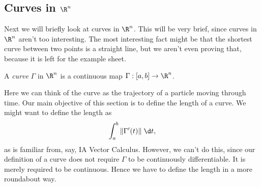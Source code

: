 \documentclass[a4paper]{article}
\begin{document}
\subsection{Curves in \texorpdfstring{$\R^n$}{Rn}}
Next we will briefly look at curves in $\R^n$. This will be very brief, since curves in $\R^n$ aren't too interesting. The most interesting fact might be that the shortest curve between two points is a straight line, but we aren't even proving that, because it is left for the example sheet.

\begin{defi}[Curve]
  A \emph{curve} $\Gamma$ in $\R^n$ is a continuous map $\Gamma: [a, b] \to \R^n$.
\end{defi}
Here we can think of the curve as the trajectory of a particle moving through time. Our main objective of this section is to define the length of a curve. We might want to define the length as
\[
  \int_a^b \|\Gamma'(t)\|\;\d t,
\]
as is familiar from, say, IA Vector Calculus. However, we can't do this, since our definition of a curve does not require $\Gamma$ to be continuously differentiable. It is merely required to be continuous. Hence we have to define the length in a more roundabout way.
\end{document}
